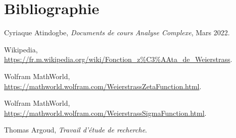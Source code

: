 \documentclass{article}
\begin{document}
\section*{Bibliographie}

\begin{thebibliography}{9}

Cyriaque Atindogbe, \textit{Documents de cours Analyse Complexe}, Mars 2022.

Wikipedia, \url{https://fr.m.wikipedia.org/wiki/Fonction_z%C3%AAta_de_Weierstrass}.

Wolfram MathWorld, \url{https://mathworld.wolfram.com/WeierstrassZetaFunction.html}.

Wolfram MathWorld, \url{https://mathworld.wolfram.com/WeierstrassSigmaFunction.html}.

Thomas Argoud, \textit{Travail d'étude de recherche}.

\end{thebibliography}
\end{document}
